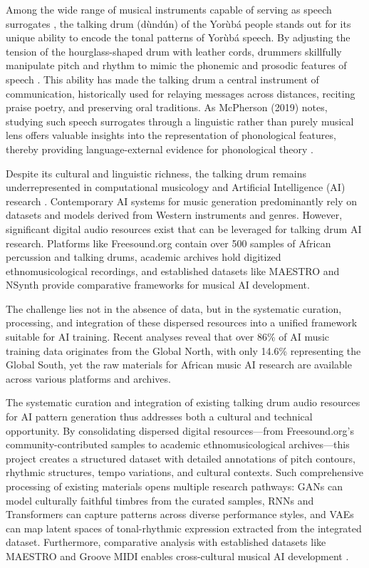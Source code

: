 \documentclass[12pt,a4paper]{article}
\begin{document}
Among the wide range of musical instruments capable of serving as speech surrogates \cite{lo1987,agawu2016}, the talking drum (dùndún) of the Yorùbá people stands out for its unique ability to encode the tonal patterns of Yorùbá speech. By adjusting the tension of the hourglass-shaped drum with leather cords, drummers skillfully manipulate pitch and rhythm to mimic the phonemic and prosodic features of speech \cite{beier1954,euba1967,euba1990,villepastour2010}. This ability has made the talking drum a central instrument of communication, historically used for relaying messages across distances, reciting praise poetry, and preserving oral traditions. As McPherson (2019) notes, studying such speech surrogates through a linguistic rather than purely musical lens offers valuable insights into the representation of phonological features, thereby providing language-external evidence for phonological theory \cite{akinbo2021}.

Despite its cultural and linguistic richness, the talking drum remains underrepresented in computational musicology and Artificial Intelligence (AI) research \cite{akinbo2021}. Contemporary AI systems for music generation predominantly rely on datasets and models derived from Western instruments and genres. However, significant digital audio resources exist that can be leveraged for talking drum AI research. Platforms like Freesound.org contain over 500 samples of African percussion and talking drums, academic archives hold digitized ethnomusicological recordings, and established datasets like MAESTRO and NSynth provide comparative frameworks for musical AI development.

The challenge lies not in the absence of data, but in the systematic curation, processing, and integration of these dispersed resources into a unified framework suitable for AI training. Recent analyses reveal that over 86\% of AI music training data originates from the Global North, with only 14.6\% representing the Global South, yet the raw materials for African music AI research are available across various platforms and archives.

The systematic curation and integration of existing talking drum audio resources for AI pattern generation thus addresses both a cultural and technical opportunity. By consolidating dispersed digital resources—from Freesound.org's community-contributed samples to academic ethnomusicological archives—this project creates a structured dataset with detailed annotations of pitch contours, rhythmic structures, tempo variations, and cultural contexts. Such comprehensive processing of existing materials opens multiple research pathways: GANs can model culturally faithful timbres from the curated samples, RNNs and Transformers can capture patterns across diverse performance styles, and VAEs can map latent spaces of tonal-rhythmic expression extracted from the integrated dataset. Furthermore, comparative analysis with established datasets like MAESTRO and Groove MIDI enables cross-cultural musical AI development \cite{zhu2023}.
\end{document}
